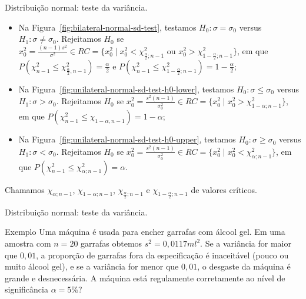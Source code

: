 \documentclass[8pt]{beamer}
\begin{document}
\begin{frame}{Distribuição normal: teste da variância.}


\begin{itemize}
	\item Na Figura~\ref{fig:bilateral-normal-sd-test}, testamos $H_0: \sigma = \sigma_0$ versus $H_1: \sigma \neq \sigma_0$. Rejeitamos $H_0$ se $x_0^2 = \frac{(n-1)s^2}{\sigma^2} \in \allowbreak RC=\{x_0^2 \mid x_0^2 < \chi_{\frac{\alpha}{2}; n-1}^2 \mbox{ ou } x_0^2 > \chi_{1-\frac{\alpha}{2};n-1}^2 \}$, em que $P\left(\chi_{n-1}^2 \leq \chi_{\frac{\alpha}{2}, n-1}^2 \right) = \frac{\alpha}{2}$ e $P\left(\chi_{n-1}^2 \leq  \chi_{1-\frac{\alpha}{2};n-1}^2 \right) = 1- \frac{\alpha}{2}$;
	\vfill
	
	\item Na Figura~\ref{fig:unilateral-normal-sd-test-h0-lower}, testamos $H_0: \sigma \leq \sigma_0$ versus $H_1: \sigma > \sigma_0$. Rejeitamos $H_0$ se $x_0^2 = \frac{s^2(n-1)}{\sigma_0^2} \in \allowbreak RC=\{x_0^2 \mid x_0^2 > \chi_{1-\alpha;n-1}^2  \}$, em que $P\left(\chi_{n-1}^2 \leq  \chi_{1-\alpha, n-1} \right) =1- \alpha$;
	\vfill
	
	\item Na Figura~\ref{fig:unilateral-normal-sd-test-h0-upper}, testamos $H_0: \sigma \geq \sigma_0$ versus $H_1: \sigma < \sigma_0$. Rejeitamos $H_0$ se $x_0^2 = \frac{s^2(n-1)}{\sigma_0^2} \in \allowbreak RC=\{x_0^2 \mid x_0^2 < \chi_{\alpha;n-1}^2  \}$, em que $P\left(\chi_{n-1}^2 \leq  \chi_{\alpha;n-1}^2 \right) = \alpha$.
\end{itemize}
Chamamos $\chi_{\alpha; n-1}$, $\chi_{1-\alpha; n-1}$, $\chi_{\frac{\alpha}{2};n-1}$  e $\chi_{1-\frac{\alpha}{2};n-1}$ de valores críticos.
\end{frame}

\begin{frame}{Distribuição normal: teste da variância.}

\large
\begin{block}{Exemplo}
	Uma máquina é usada para encher garrafas com álcool gel. Em uma amostra com $n=20$ garrafas obtemos $s^2=0,0117ml^2$. Se a variância for maior que $0,01$, a proporção de garrafas fora da especificação é inaceitável (pouco ou muito álcool gel), e se a variância for menor que $0,01$, o desgaste da máquina é grande e desnecessária. A máquina está regulamente corretamente ao nível de significância $\alpha=5\%$?
\end{block}
\normalsize

\end{frame}
\end{document}
